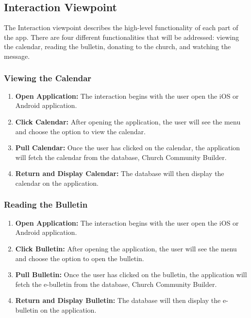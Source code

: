 \documentclass[letterpaper,10pt,draftclsnofoot,onecolumn,titlepage]{IEEEtran}
\begin{document}
		\subsection{Interaction Viewpoint}
			The Interaction viewpoint describes the high-level functionality of each part of the app.
			There are four different functionalities that will be addressed: viewing the calendar, reading the bulletin, donating to the church, and watching the message.

			\subsubsection{Viewing the Calendar}
				\begin{enumerate}
					\item \textbf{Open Application:} The interaction begins with the user open the iOS or Android application.
					\item \textbf{Click Calendar:} After opening the application, the user will see the menu and choose the option to view the calendar.
					\item \textbf{Pull Calendar:} Once the user has clicked on the calendar, the application will fetch the calendar from the database, Church Community Builder.
					\item \textbf{Return and Display Calendar:} The database will then display the calendar on the application.
				\end{enumerate}

			\subsubsection{Reading the Bulletin}
				\begin{enumerate}
					\item \textbf{Open Application:} The interaction begins with the user open the iOS or Android application.
					\item \textbf{Click Bulletin:} After opening the application, the user will see the menu and choose the option to open the bulletin.
					\item \textbf{Pull Bulletin:} Once the user has clicked on the bulletin, the application will fetch the e-bulletin from the database, Church Community Builder.
					\item \textbf{Return and Display Bulletin:} The database will then display the e-bulletin on the application.
				\end{enumerate}
\end{document}

